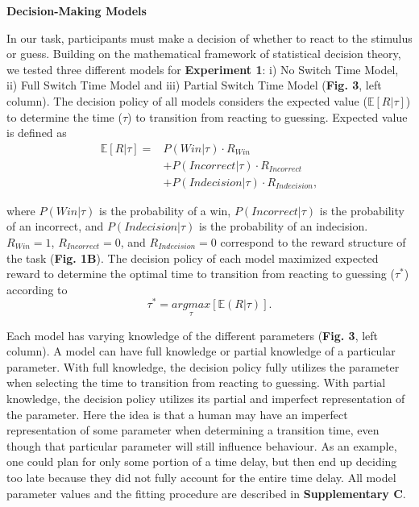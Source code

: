 \documentclass[12pt]{article}
\newcommand\boldblue[1]{\textcolor{mydarkblue}{\textbf{#1}}}
\begin{document}
\vspace{10mm}
\noindent \boldblue{{{Decision-Making Models}}}

\noindent In our task, participants must make a decision of whether to react to the stimulus or guess. Building on the mathematical framework of statistical decision theory\autocite*{trommershauserStatisticalDecisionTheory2003}, we tested three different models for \boldblue{Experiment 1}: i) No Switch Time Model, ii) Full Switch Time Model and iii) Partial Switch Time Model (\boldblue{Fig. 3}, left column). The decision policy of all models considers the expected value ($\mathbb{E}[R|\tau]$) to determine the time ($\tau$) to transition from reacting to guessing. Expected value is defined as
\setlength{\belowdisplayskip}{4pt} \setlength{\belowdisplayshortskip}{4pt} %
\setlength{\abovedisplayskip}{4pt} \setlength{\abovedisplayshortskip}{4pt}
\begin{align}
    \mathbb{E}[R|\tau] = & P(Win|\tau) \cdot R_{Win} \nonumber \\ &+ P(Incorrect|\tau) \cdot R_{Incorrect} \nonumber \\ &+ P(Indecision|\tau) \cdot R_{Indecision},
\end{align}

\noindent where $P(Win|\tau)$ is the probability of a win, $P(Incorrect|\tau)$ is the probability of an incorrect, and $P(Indecision|\tau)$ is the probability of an indecision. $R_{Win} = 1$, $R_{Incorrect} = 0$, and $R_{Indecision} = 0$ correspond to the reward structure of the task (\boldblue{Fig. 1B}). The decision policy of each model maximized expected reward to determine the optimal time to transition from reacting to guessing ($\tau^*$) according to
\begin{equation}
    \tau^* = \underset{\tau}{argmax}[\mathbb{E}(R|\tau)].
\end{equation}

Each model has varying knowledge of the different parameters (\boldblue{Fig. 3}, left column). A model can have full knowledge or partial knowledge of a particular parameter. With full knowledge, the decision policy fully utilizes the parameter when selecting the time to transition from reacting to guessing. With partial knowledge, the decision policy utilizes its partial and imperfect representation of the parameter. Here the idea is that a human may have an imperfect representation of some parameter when determining a transition time, even though that particular parameter will still influence behaviour. As an example, one could plan for only some portion of a time delay, but then end up deciding too late because they did not fully account for the entire time delay. All model parameter values and the fitting procedure are described in \boldblue{Supplementary C}. 
\end{document}
